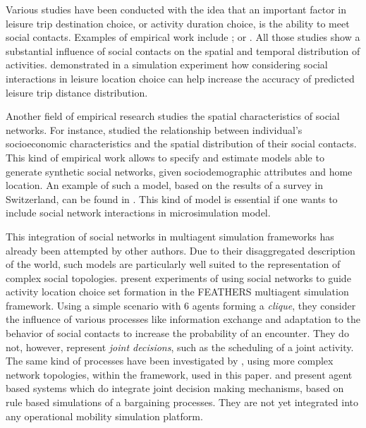 {Various studies have been conducted with the idea that an important factor in leisure trip destination
choice, or activity duration choice, is the ability to meet social contacts.
Examples of empirical work include ;  or .
All those studies show a substantial influence of social contacts on the spatial and temporal
distribution of activities.
%
%
 demonstrated in a simulation experiment how considering social interactions
in leisure location choice can help increase the accuracy of predicted leisure trip distance distribution.

Another field of empirical research studies the spatial characteristics of social networks.
For instance,  studied the relationship between individual's socioeconomic
characteristics and the spatial distribution of their social contacts.
This kind of empirical work allows to specify and estimate models able to generate synthetic social networks,
given sociodemographic attributes and home location.
An example of such a model, based on the results of a survey in Switzerland,
can be found in .
This kind of model is essential if one wants to include social network interactions
in microsimulation model.

This integration of social networks in multiagent simulation frameworks has already
been attempted by other authors.
Due to their disaggregated description of the world,
such models are particularly well suited to the representation of complex social topologies.
 present experiments of using social networks
to guide activity location choice set formation in the FEATHERS multiagent simulation framework.
Using a simple scenario with 6 agents forming a \emph{clique},
they consider the influence of various processes like
information exchange and adaptation to the behavior of social contacts to increase the probability
of an encounter.
They do not, however, represent \emph{joint decisions}, such as the scheduling of a joint activity.
The same kind of processes have been investigated by ,
using more complex network topologies,
within the \matsim framework, used in this paper.
and 
present agent based systems which do integrate
joint decision making mechanisms,
based on rule based simulations of a bargaining processes.
They are not yet integrated into
any operational mobility simulation platform.

}
